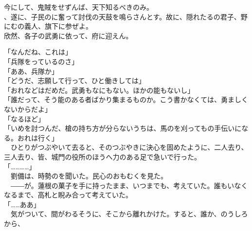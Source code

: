 \documentclass[
  paper=a5,
  fontsize=10pt,
  jafontsize=9.5pt,
  tate,                  %
  open_bracket_pos=nibu, %
]{jlreq}
\begin{document}
今にして、鬼賊をせずんば、天下知るべきのみ。\\

、遂に、子民のに奮って討伐の天鼓を鳴らさんとす。故に、隠れたるの君子、野にむの義人、旗下に参ぜよ。\\


欣然、各子の武勇に依って、府に迎えん。\\



「なんだね、これは」\\


「兵隊をっているのさ」\\


「ああ、兵隊か」\\


「どうだ、志願して行って、ひと働きしては」\\


「おれなどはだめだ。武勇もなにもない。ほかの能もないし」\\


「誰だって、そう能のある者ばかり集まるものか。こう書かなくては、勇ましくないからだよ」\\


「なるほど」\\


「いめを討つんだ、槍の持ち方が分らないうちは、馬のを刈ってもの手伝いになる。おれは行く」\\


　ひとりがつぶやいて去ると、そのつぶやきに決心を固めたように、二人去り、三人去り、皆、城門の役所のほうへ力のある足で急いで行った。\\


「…………」\\


　劉備は、時勢のを聞いた。民心のおもむくを見た。\\


　――が。蓮根の菓子を手に持ったまま、いつまでも、考えていた。誰もいなくなるまで、高札と睨み合って考えていた。\\


「……ああ」\\


　気がついて、間がわるそうに、そこから離れかけた。すると、誰か、のうしろから、\\
\end{document}
